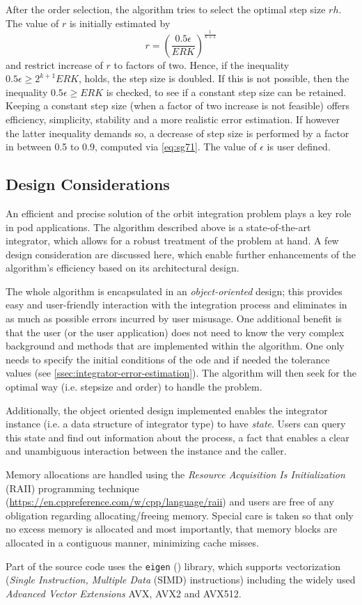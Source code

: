 After the order selection, the algorithm tries to select the optimal step size $rh$. 
The value of $r$ is initially estimated by
\begin{equation}\label{eq:sg71}
  r = \left( \frac{0.5 \epsilon}{ERK} \right) ^{\frac{1}{k+1}}
\end{equation}
and restrict increase of $r$ to factors of two. Hence, if the inequality 
$0.5 \epsilon \ge 2^{k+1}ERK$, holds, the step size is doubled. If this is not 
possible, then the inequality $0.5 \epsilon \ge ERK$ is checked, to see if a constant 
step size can be retained. Keeping a constant step size (when a factor of two 
increase is not feasible) offers efficiency, simplicity, stability and a more 
realistic error estimation. If however the latter inequality demands so, a decrease 
of step size is performed by a factor in between 0.5 to 0.9, computed via \autoref{eq:sg71}.
The value of $\epsilon$ is user defined.

\subsection{Design Considerations}\label{ssec:design-considerations}
An efficient and precise solution of the orbit integration problem plays a key 
role in \gls{pod} applications. The algorithm described above is a state-of-the-art 
integrator, which allows for a robust treatment of the problem at hand. 
A few design consideration are discussed here, which enable further enhancements 
of the algorithm's efficiency based on its architectural design.

The whole algorithm is encapsulated in an \emph{object-oriented} design; this provides easy and 
user-friendly interaction with the integration process and eliminates in as much as 
possible errors incurred by user misusage. One additional benefit is that the 
user (or the user application) does not need to know the very complex background and 
methods that are implemented within the algorithm. One only needs to specify the 
initial conditions of the \gls{ode} and if needed the tolerance values (see 
\autoref{ssec:integrator-error-estimation}). The algorithm will then seek for the 
optimal way (i.e. stepsize and order) to handle the problem.

Additionally, the object oriented design implemented enables the integrator instance (i.e. 
a data structure of integrator type) to have \emph{state}. Users can query this state 
and find out information about the process, a fact that enables a clear and unambiguous 
interaction between the instance and the caller.

Memory allocations are handled using the \emph{Resource Acquisition Is Initialization} (RAII) 
programming technique (\url{https://en.cppreference.com/w/cpp/language/raii}) and 
users are free of any obligation regarding allocating/freeing memory. Special care is 
taken so that only no excess memory is allocated and most importantly, that memory blocks 
are allocated in a contiguous manner, minimizing cache misses.

Part of the source code uses the \texttt{eigen} (\cite{eigenweb}) library, which 
supports vectorization (\emph{Single Instruction, Multiple Data} (SIMD) instructions) 
including the widely used \emph{Advanced Vector Extensions} AVX, AVX2 and AVX512.
